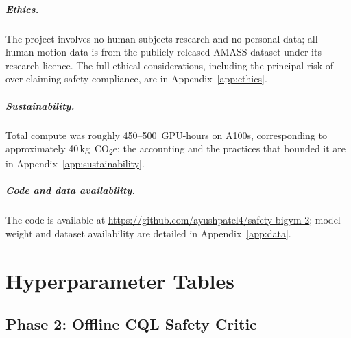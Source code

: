 \documentclass[11pt,a4paper]{report}
\begin{document}
\paragraph{Ethics.}
The project involves no human-subjects research and no personal
data; all human-motion data is from the publicly released AMASS
dataset under its research licence. The full ethical considerations,
including the principal risk of over-claiming safety compliance, are
in Appendix~\ref{app:ethics}.

\paragraph{Sustainability.}
Total compute was roughly 450--500~GPU-hours on A100s,
corresponding to approximately 40\,kg~CO\textsubscript{2}e; the
accounting and the practices that bounded it are in
Appendix~\ref{app:sustainability}.

\paragraph{Code and data availability.}
The code is available at
\url{https://github.com/ayushpatel4/safety-bigym-2}; model-weight and
dataset availability are detailed in Appendix~\ref{app:data}.


\appendix
\renewcommand*{\theHchapter}{appx.\Alph{chapter}}

\chapter{Hyperparameter Tables}
\label{app:hparams}

\section{Phase 2: Offline CQL Safety Critic}
\label{app:hparams:svf}
\end{document}

